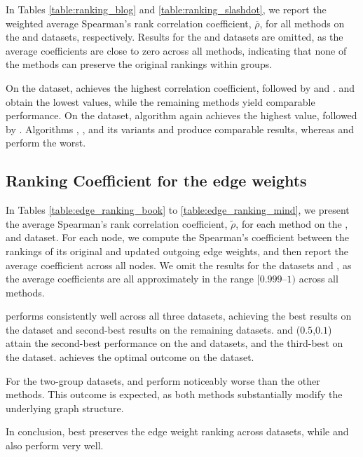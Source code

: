 In Tables \ref{table:ranking_blog} and \ref{table:ranking_slashdot}, we report the weighted average Spearman’s rank correlation coefficient, $\overline{\rho}$, for all methods on the \blogs and \slashdot datasets, respectively. Results for the \book and \twitter datasets are omitted, as the average coefficients are close to zero across all methods, indicating that none of the methods can preserve the original \pagerank rankings within groups.

On the \blogs dataset, \crossgdrone achieves the highest correlation coefficient, followed by \lfprn and \lfpru. \fairgdrtwo and \crossgd obtain the lowest values, while the remaining methods yield comparable performance. 
On the \slashdot dataset, algorithm \crossgdrone again achieves the highest value, followed by \crossgdrtwo. Algorithms \crossgd, \fairgd, and its variants \fairgdrone and \fairgdrtwo produce comparable results, whereas \fairwalk and \crosswalk perform the worst.

\subsection{Ranking Coefficient for the edge weights}

In Tables \ref{table:edge_ranking_book} to \ref{table:edge_ranking_mind}, we present the average Spearman’s rank correlation coefficient, $\tilde{\rho}$, for each method on the \book, \blogs and 
\mind dataset. For each node, we compute the Spearman’s coefficient between the rankings of its original and updated outgoing edge weights, and then report the average coefficient across all nodes.
We omit the results for the datasets \twitter and \slashdot, as the average coefficients are all approximately in the range $[0.999–1)$ across all methods.

\fairwalk performs consistently well across all three datasets, achieving the best results on the \book dataset and second-best results on the remaining datasets. \crossgdrone and \crossgd($0.5$,$0.1$) attain the second-best performance on the \book and \blogs datasets, and the third-best on the \mind dataset. \fairgd achieves the optimal outcome on the \mind dataset.

For the two-group datasets, \lfpru and \lfprn perform noticeably worse than the other methods. This outcome is expected, as both methods substantially modify the underlying graph structure.

In conclusion, \fairwalk best preserves the edge weight ranking across datasets, while \crossgdrone and \crossgdrtwo also perform very well.


